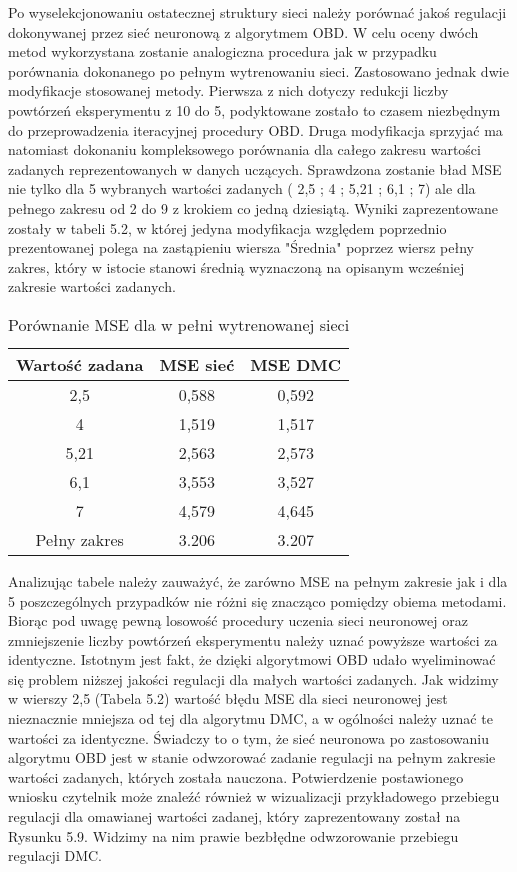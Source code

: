 \par Po wyselekcjonowaniu ostatecznej struktury sieci należy porównać jakoś regulacji dokonywanej przez sieć neuronową z algorytmem OBD. W celu oceny dwóch metod wykorzystana zostanie analogiczna procedura jak w przypadku porównania dokonanego po pełnym wytrenowaniu sieci. Zastosowano jednak dwie modyfikacje stosowanej metody. Pierwsza z nich dotyczy redukcji liczby powtórzeń eksperymentu z 10 do 5, podyktowane zostało to czasem niezbędnym do przeprowadzenia iteracyjnej procedury OBD. Druga modyfikacja sprzyjać ma natomiast dokonaniu kompleksowego porównania dla całego zakresu wartości zadanych reprezentowanych w danych uczących. Sprawdzona zostanie bład MSE nie tylko dla 5 wybranych wartości zadanych ( 2,5 ; 4 ; 5,21 ; 6,1 ; 7) ale dla pełnego zakresu od 2 do 9 z krokiem co jedną dziesiątą. Wyniki zaprezentowane zostały w tabeli 5.2, w której jedyna modyfikacja względem poprzednio prezentowanej polega na zastąpieniu wiersza "Średnia" poprzez wiersz pełny zakres, który w istocie stanowi średnią wyznaczoną na opisanym wcześniej zakresie wartości zadanych.

\begin{table}[!h] \label{tab:tabela2} \centering
\caption{Porównanie MSE dla w pełni wytrenowanej sieci}
\begin{tabular} {| c | c | c |} \hline
    Wartość zadana & MSE sieć & MSE DMC \\ \hline\hline
    2,5 & 0,588 & 0,592 \\ \hline
    4 & 1,519 & 1,517 \\ \hline
    5,21 & 2,563 & 2,573 \\ \hline
    6,1 & 3,553 & 3,527 \\ \hline
    7 & 4,579 & 4,645 \\ \hline
    Pełny zakres & 3.206  & 3.207 \\ \hline  
\end{tabular}
\end{table}

\par Analizując tabele należy zauważyć, że zarówno MSE na pełnym zakresie jak i dla 5 poszczególnych przypadków nie różni się znacząco pomiędzy obiema metodami. Biorąc pod uwagę pewną losowość procedury uczenia sieci neuronowej oraz zmniejszenie liczby powtórzeń eksperymentu należy uznać powyższe wartości za identyczne. Istotnym jest fakt, że dzięki algorytmowi OBD udało wyeliminować się problem niższej jakości regulacji dla małych wartości zadanych. Jak widzimy w wierszy 2,5 (Tabela 5.2)  wartość błędu MSE dla sieci neuronowej jest nieznacznie mniejsza od tej dla algorytmu DMC, a w ogólności należy uznać te wartości za identyczne. Świadczy to o tym, że sieć neuronowa po zastosowaniu algorytmu OBD jest w stanie odwzorować zadanie regulacji na pełnym zakresie wartości zadanych, których została nauczona. Potwierdzenie postawionego wniosku czytelnik może znaleźć również w wizualizacji przykładowego przebiegu regulacji dla omawianej wartości zadanej, który zaprezentowany został na Rysunku 5.9. Widzimy na nim prawie bezbłędne odwzorowanie przebiegu regulacji DMC. 

